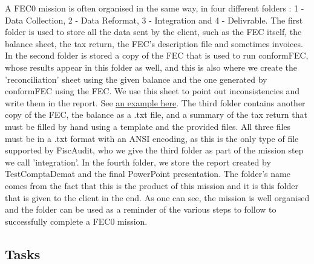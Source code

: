 \documentclass[12pt]{article}
\begin{document}
A FEC0 mission is often organised in the same way, in four different folders : 1 - Data Collection, 2 - Data Reformat, 3 - Integration and 4 - Delivrable. The first folder is used to store all the data sent by the client, such as the FEC itself, the balance sheet, the tax return, the FEC's description file and sometimes invoices. In the second folder is stored a copy of the FEC that is used to run conformFEC, whose results appear in this folder as well, and this is also where we create the 'reconciliation' sheet using the given balance and the one generated by conformFEC using the FEC. We use this sheet to point out inconsistencies and write them in the report. See \hyperref[recon]{an example here}. The third folder contains another copy of the FEC, the balance as a .txt file, and a summary of the tax return that must be filled by hand using a template and the provided files. All three files must be in a .txt format with an ANSI encoding, as this is the only type of file supported by FiscAudit, who we give the third folder as part of the mission step we call 'integration'. In the fourth folder, we store the report created by TestComptaDemat and the final PowerPoint presentation. The folder's name comes from the fact that this is the product of this mission and it is this folder that is given to the client in the end. As one can see, the mission is well organised and the folder can be used as a reminder of the various steps to follow to successfully complete a FEC0 mission.

\subsection{Tasks}
\end{document}
